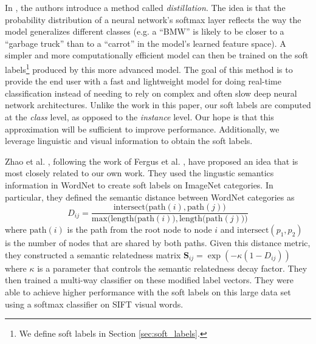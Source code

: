 In \cite{hinton2015distilling}, the authors introduce a method called
\emph{distillation}. The idea is that the probability distribution of a neural
network's softmax layer reflects the way the model generalizes different
classes (e.g. a ``BMW'' is likely to be closer to a ``garbage truck'' than to a
``carrot'' in the model's learned feature space). A simpler and more
computationally efficient model can then be trained on the
soft labels\footnote{
  We define soft labels in Section \ref{sec:soft_labels}.
} produced by this more advanced model.
The goal of this method is to provide the end user with a fast and lightweight
model for doing real-time classification instead of needing to rely on complex
and often slow deep neural network architectures.
Unlike the work in this paper, our soft labels are computed at the \emph{class}
level, as opposed to the \emph{instance} level. Our hope is that this
approximation will be sufficient to improve performance. Additionally, we
leverage linguistic and visual information to obtain the soft labels.


Zhao et al. \cite{zhao2011large}, following the work of Fergus et al.
\cite{fergus2010semantic}, have proposed an idea that is most closely related
to our own work.
They used the lingustic semantics information in WordNet to create soft labels
on ImageNet categories. In particular, they defined the semantic distance
between WordNet categories as
\begin{equation}
\label{eq:wordnet_dist}
D_{ij} = \frac{\mathrm{intersect(path}(i), \mathrm{path}(j))}{\mathrm{max(length(path}(i)), \mathrm{length(path}(j)))}
\end{equation}
where $\mathrm{path}(i)$ is the path from the root node to node $i$ and
$\mathrm{intersect}(p_1, p_2)$ is the number of nodes that are shared by both
paths. Given this distance metric, they constructed a semantic relatedness
matrix $\mathbf{S}_{ij} = \exp(-\kappa(1-D_{ij}))$ where $\kappa$ is a
parameter that controls the semantic relatedness decay factor.
They then trained a multi-way classifier on these modified label vectors. They
were able to achieve higher performance with the soft labels on this large data
set using a softmax classifier on SIFT visual words.


